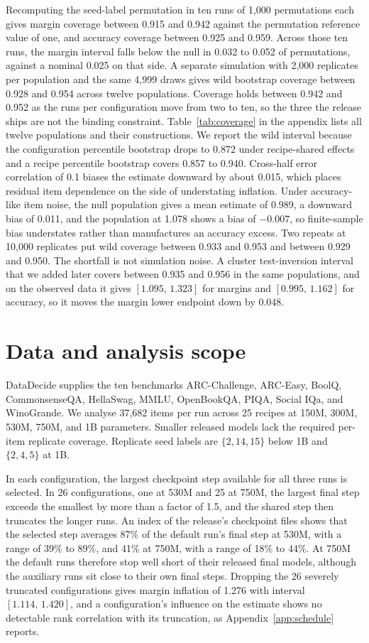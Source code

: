 \documentclass{article}
\newcommand{\ci}[2]{\ensuremath{[#1,\,#2]}}
\begin{document}
Recomputing the seed-label permutation in ten runs of 1,000 permutations each gives margin coverage between 0.915 and 0.942 against the permutation reference value of one, and accuracy coverage between 0.925 and 0.959. Across those ten runs, the margin interval falls below the null in 0.032 to 0.052 of permutations, against a nominal 0.025 on that side. A separate simulation with 2,000 replicates per population and the same 4,999 draws gives wild bootstrap coverage between 0.928 and 0.954 across twelve populations. Coverage holds between 0.942 and 0.952 as the runs per configuration move from two to ten, so the three the release ships are not the binding constraint. Table~\ref{tab:coverage} in the appendix lists all twelve populations and their constructions. We report the wild interval because the configuration percentile bootstrap drops to 0.872 under recipe-shared effects and a recipe percentile bootstrap covers 0.857 to 0.940. Cross-half error correlation of 0.1 biases the estimate downward by about 0.015, which places residual item dependence on the side of understating inflation. Under accuracy-like item noise, the null population gives a mean estimate of 0.989, a downward bias of 0.011, and the population at 1.078 shows a bias of $-0.007$, so finite-sample bias understates rather than manufactures an accuracy excess. Two repeats at 10,000 replicates put wild coverage between 0.933 and 0.953 and between 0.929 and 0.950. The shortfall is not simulation noise. A cluster test-inversion interval that we added later covers between 0.935 and 0.956 in the same populations, and on the observed data it gives \ci{1.095}{1.323} for margins and \ci{0.995}{1.162} for accuracy, so it moves the margin lower endpoint down by 0.048.

\section{Data and analysis scope}
DataDecide supplies the ten benchmarks ARC-Challenge, ARC-Easy, BoolQ, CommonsenseQA, HellaSwag, MMLU, OpenBookQA, PIQA, Social IQa, and WinoGrande. We analyse 37,682 items per run across 25 recipes at 150M, 300M, 530M, 750M, and 1B parameters. Smaller released models lack the required per-item replicate coverage. Replicate seed labels are $\{2,14,15\}$ below 1B and $\{2,4,5\}$ at 1B.

In each configuration, the largest checkpoint step available for all three runs is selected. In 26 configurations, one at 530M and 25 at 750M, the largest final step exceeds the smallest by more than a factor of 1.5, and the shared step then truncates the longer runs. An index of the release's checkpoint files shows that the selected step averages 87\% of the default run's final step at 530M, with a range of 39\% to 89\%, and 41\% at 750M, with a range of 18\% to 44\%. At 750M the default runs therefore stop well short of their released final models, although the auxiliary runs sit close to their own final steps. Dropping the 26 severely truncated configurations gives margin inflation of 1.276 with interval \ci{1.114}{1.420}, and a configuration's influence on the estimate shows no detectable rank correlation with its truncation, as Appendix~\ref{app:schedule} reports.
\end{document}
